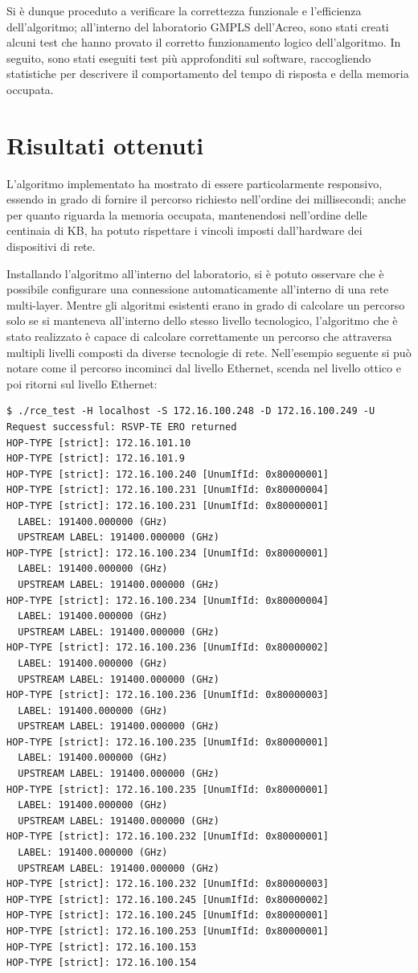 \documentclass[10pt,a4paper]{article}
\begin{document}
Si è dunque proceduto a verificare la correttezza funzionale e
l'efficienza dell'algoritmo; all'interno del laboratorio GMPLS
dell'Acreo, sono stati creati alcuni test che hanno provato il
corretto funzionamento logico dell'algoritmo. In seguito, sono stati
eseguiti test più approfonditi sul software, raccogliendo statistiche
per descrivere il comportamento del tempo di risposta e della memoria
occupata.

\section*{Risultati ottenuti}

L'algoritmo implementato ha mostrato di essere particolarmente
responsivo, essendo in grado di fornire il percorso richiesto
nell'ordine dei millisecondi; anche per quanto riguarda la memoria
occupata, mantenendosi nell'ordine delle centinaia di KB, ha potuto
rispettare i vincoli imposti dall'hardware dei dispositivi di rete.

Installando l'algoritmo all'interno del laboratorio, si è potuto
osservare che è possibile configurare una connessione automaticamente
all'interno di una rete multi-layer. Mentre gli algoritmi esistenti
erano in grado di calcolare un percorso solo se si manteneva
all'interno dello stesso livello tecnologico, l'algoritmo che è stato
realizzato è capace di calcolare correttamente un percorso che
attraversa multipli livelli composti da diverse tecnologie di
rete. Nell'esempio seguente si può notare come il percorso incominci
dal livello Ethernet, scenda nel livello ottico e poi ritorni sul
livello Ethernet:

\small{
\begin{verbatim}
$ ./rce_test -H localhost -S 172.16.100.248 -D 172.16.100.249 -U
Request successful: RSVP-TE ERO returned
HOP-TYPE [strict]: 172.16.101.10
HOP-TYPE [strict]: 172.16.101.9
HOP-TYPE [strict]: 172.16.100.240 [UnumIfId: 0x80000001]
HOP-TYPE [strict]: 172.16.100.231 [UnumIfId: 0x80000004]
HOP-TYPE [strict]: 172.16.100.231 [UnumIfId: 0x80000001]
  LABEL: 191400.000000 (GHz)
  UPSTREAM LABEL: 191400.000000 (GHz)
HOP-TYPE [strict]: 172.16.100.234 [UnumIfId: 0x80000001]
  LABEL: 191400.000000 (GHz)
  UPSTREAM LABEL: 191400.000000 (GHz)
HOP-TYPE [strict]: 172.16.100.234 [UnumIfId: 0x80000004]
  LABEL: 191400.000000 (GHz)
  UPSTREAM LABEL: 191400.000000 (GHz)
HOP-TYPE [strict]: 172.16.100.236 [UnumIfId: 0x80000002]
  LABEL: 191400.000000 (GHz)
  UPSTREAM LABEL: 191400.000000 (GHz)
HOP-TYPE [strict]: 172.16.100.236 [UnumIfId: 0x80000003]
  LABEL: 191400.000000 (GHz)
  UPSTREAM LABEL: 191400.000000 (GHz)
HOP-TYPE [strict]: 172.16.100.235 [UnumIfId: 0x80000001]
  LABEL: 191400.000000 (GHz)
  UPSTREAM LABEL: 191400.000000 (GHz)
HOP-TYPE [strict]: 172.16.100.235 [UnumIfId: 0x80000001]
  LABEL: 191400.000000 (GHz)
  UPSTREAM LABEL: 191400.000000 (GHz)
HOP-TYPE [strict]: 172.16.100.232 [UnumIfId: 0x80000001]
  LABEL: 191400.000000 (GHz)
  UPSTREAM LABEL: 191400.000000 (GHz)
HOP-TYPE [strict]: 172.16.100.232 [UnumIfId: 0x80000003]
HOP-TYPE [strict]: 172.16.100.245 [UnumIfId: 0x80000002]
HOP-TYPE [strict]: 172.16.100.245 [UnumIfId: 0x80000001]
HOP-TYPE [strict]: 172.16.100.253 [UnumIfId: 0x80000001]
HOP-TYPE [strict]: 172.16.100.153
HOP-TYPE [strict]: 172.16.100.154
\end{verbatim}}
\end{document}
